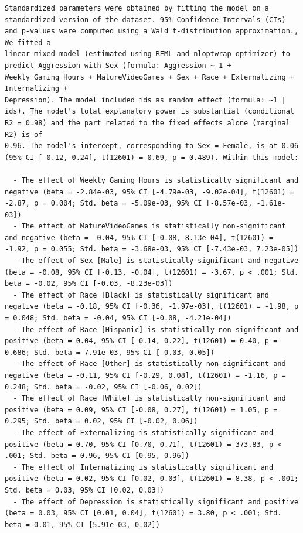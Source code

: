 \documentclass{article}
\begin{document}
\begin{verbatim}
Standardized parameters were obtained by fitting the model on a standardized version of the dataset. 95% Confidence Intervals (CIs) and p-values were computed using a Wald t-distribution approximation., We fitted a
linear mixed model (estimated using REML and nloptwrap optimizer) to predict Aggression with Sex (formula: Aggression ~ 1 + Weekly_Gaming_Hours + MatureVideoGames + Sex + Race + Externalizing + Internalizing +
Depression). The model included ids as random effect (formula: ~1 | ids). The model's total explanatory power is substantial (conditional R2 = 0.98) and the part related to the fixed effects alone (marginal R2) is of
0.96. The model's intercept, corresponding to Sex = Female, is at 0.06 (95% CI [-0.12, 0.24], t(12601) = 0.69, p = 0.489). Within this model:

  - The effect of Weekly Gaming Hours is statistically significant and negative (beta = -2.84e-03, 95% CI [-4.79e-03, -9.02e-04], t(12601) = -2.87, p = 0.004; Std. beta = -5.09e-03, 95% CI [-8.57e-03, -1.61e-03])
  - The effect of MatureVideoGames is statistically non-significant and negative (beta = -0.04, 95% CI [-0.08, 8.13e-04], t(12601) = -1.92, p = 0.055; Std. beta = -3.68e-03, 95% CI [-7.43e-03, 7.23e-05])
  - The effect of Sex [Male] is statistically significant and negative (beta = -0.08, 95% CI [-0.13, -0.04], t(12601) = -3.67, p < .001; Std. beta = -0.02, 95% CI [-0.03, -8.23e-03])
  - The effect of Race [Black] is statistically significant and negative (beta = -0.18, 95% CI [-0.36, -1.97e-03], t(12601) = -1.98, p = 0.048; Std. beta = -0.04, 95% CI [-0.08, -4.21e-04])
  - The effect of Race [Hispanic] is statistically non-significant and positive (beta = 0.04, 95% CI [-0.14, 0.22], t(12601) = 0.40, p = 0.686; Std. beta = 7.91e-03, 95% CI [-0.03, 0.05])
  - The effect of Race [Other] is statistically non-significant and negative (beta = -0.11, 95% CI [-0.29, 0.08], t(12601) = -1.16, p = 0.248; Std. beta = -0.02, 95% CI [-0.06, 0.02])
  - The effect of Race [White] is statistically non-significant and positive (beta = 0.09, 95% CI [-0.08, 0.27], t(12601) = 1.05, p = 0.295; Std. beta = 0.02, 95% CI [-0.02, 0.06])
  - The effect of Externalizing is statistically significant and positive (beta = 0.70, 95% CI [0.70, 0.71], t(12601) = 373.83, p < .001; Std. beta = 0.96, 95% CI [0.95, 0.96])
  - The effect of Internalizing is statistically significant and positive (beta = 0.02, 95% CI [0.02, 0.03], t(12601) = 8.38, p < .001; Std. beta = 0.03, 95% CI [0.02, 0.03])
  - The effect of Depression is statistically significant and positive (beta = 0.03, 95% CI [0.01, 0.04], t(12601) = 3.80, p < .001; Std. beta = 0.01, 95% CI [5.91e-03, 0.02])


\end{verbatim}
\end{document}
